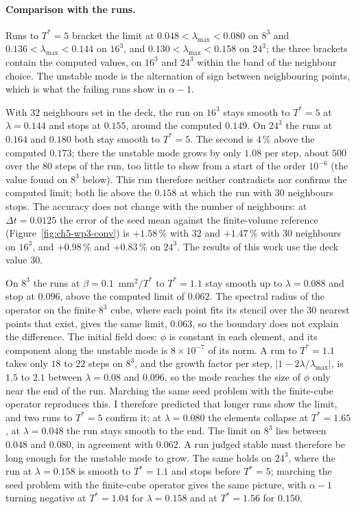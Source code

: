 \paragraph{Comparison with the runs.} Runs to $T^*=5$ bracket the limit at
$0.048<\lambda_{\max}<0.080$ on $8^3$ and $0.136<\lambda_{\max}<0.144$ on
$16^3$, and $0.130<\lambda_{\max}<0.158$ on $24^3$; the three brackets contain the
computed values, on $16^3$ and $24^3$ within the band of the neighbour choice.
The unstable mode is the alternation of sign between neighbouring points,
which is what the failing runs show in $\alpha-1$.

With $32$ neighbours set in the deck, the run on $16^3$ stays smooth to
$T^*=5$ at $\lambda=0.144$ and stops at $0.155$, around the computed $0.149$.
On $24^3$ the runs at $0.164$ and $0.180$ both stay smooth to $T^*=5$. The second is $4\,\%$ above
the computed $0.173$; there the unstable mode grows by only $1.08$ per step, about $500$ over the $80$
steps of the run, too little to show from a start of the order $10^{-6}$ (the value found on $8^3$
below). This run therefore neither contradicts nor confirms the computed limit; both lie above the
$0.158$ at which the run with $30$ neighbours stops. The accuracy does not change with the number of neighbours: at
$\Delta t=0.0125$ the error of the seed mean against the finite-volume
reference (Figure~\ref{fig:ch5-wp3-conv}) is $+1.58\,\%$ with $32$ and $+1.47\,\%$
with $30$ neighbours on $16^3$, and $+0.98\,\%$ and $+0.83\,\%$ on $24^3$.
The results of this work use the deck value $30$.

On $8^3$ the runs at $\beta=0.1$~mm$^2/T^*$ to $T^*=1.1$ stay smooth up to
$\lambda=0.088$ and stop at $0.096$, above the computed limit of $0.062$. The
spectral radius of the operator on the finite $8^3$ cube, where each point
fits its stencil over the $30$ nearest points that exist, gives the same
limit, $0.063$, so the boundary does not explain the difference. The initial
field does: $\phi$ is constant in each element, and its component along the
unstable mode is $8\times10^{-7}$ of its norm. A run to $T^*=1.1$ takes only
$18$ to $22$ steps on $8^3$, and the growth factor per step,
$|1-2\lambda/\lambda_{\max}|$, is $1.5$ to $2.1$ between $\lambda=0.08$ and
$0.096$, so the mode reaches the size of $\phi$ only near the end of the run.
Marching the same seed problem with the finite-cube operator reproduces this.
I therefore predicted that longer runs show the limit, and two runs to
$T^*=5$ confirm it: at $\lambda=0.080$ the elements collapse at $T^*=1.65$,
at $\lambda=0.048$ the run stays smooth to the end. The limit on $8^3$ lies
between $0.048$ and $0.080$, in agreement with $0.062$. A run judged stable
must therefore be long enough for the unstable mode to grow. The same holds
on $24^3$, where the run at $\lambda=0.158$ is smooth to $T^*=1.1$ and stops
before $T^*=5$; marching the seed problem with the finite-cube operator gives
the same picture, with $\alpha-1$ turning negative at $T^*=1.04$ for
$\lambda=0.158$ and at $T^*=1.56$ for $0.150$.

